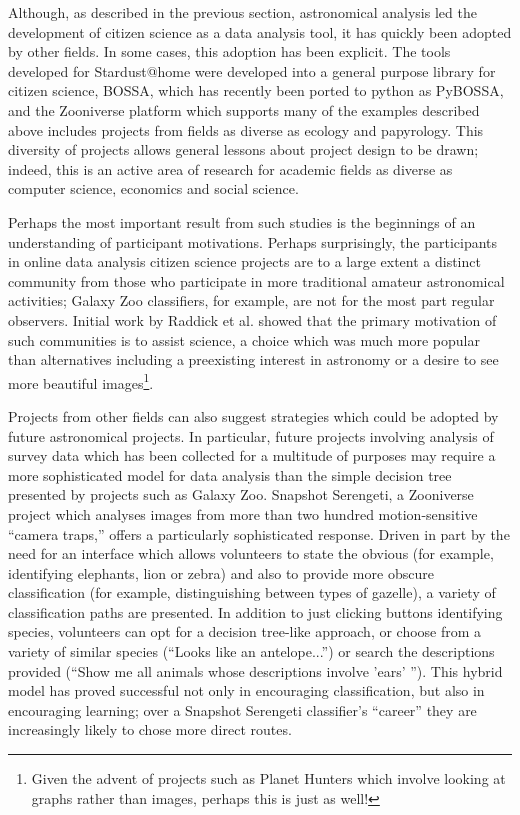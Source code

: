 \documentclass{ar2e}
\begin{document}
Although, as described in the previous section, astronomical analysis led the
development of citizen science as a data analysis tool, it has quickly been
adopted by other fields. In some cases, this adoption has been explicit. The
tools developed for Stardust@home were developed into a general purpose
library for citizen science, BOSSA, which has recently been ported to python
as PyBOSSA, and the Zooniverse platform which supports many of the examples
described above includes projects from fields as diverse as ecology and
papyrology. This diversity of projects allows general lessons about project
design to be drawn; indeed, this is an active area of research for academic
fields as diverse as computer science, economics and social science. 


Perhaps the most important result from such studies is the beginnings of an
understanding of participant motivations. Perhaps surprisingly, the
participants in online data analysis citizen science projects are to a large
extent a distinct community from those who participate in more traditional
amateur astronomical activities; Galaxy Zoo classifiers, for example, are not
for the most part regular observers. Initial work by Raddick et al. showed
that the primary motivation of such communities is to assist science, a choice
which was much more popular than alternatives including a preexisting interest
in astronomy or a desire to see more beautiful images\footnote{Given the
advent of projects such as Planet Hunters which involve looking at graphs
rather than images, perhaps this is just as well!}. 


Projects from other fields can also suggest strategies which could be adopted
by future astronomical projects. In particular, future projects involving
analysis of survey data which has been collected for a multitude of purposes
may require a more sophisticated model for data analysis than the simple
decision tree presented by projects such as Galaxy Zoo. Snapshot Serengeti, a
Zooniverse project which analyses images from more than two hundred
motion-sensitive ``camera traps,'' offers a particularly sophisticated response.
Driven in part by the need for an interface which allows volunteers to state
the obvious (for example, identifying elephants, lion or zebra) and also to
provide more obscure classification (for example, distinguishing between types
of gazelle), a variety of classification paths are presented. In addition to
just clicking buttons identifying species, volunteers can opt for a decision
tree-like approach, or choose from a variety of similar species (``Looks like
an antelope...'') or search the descriptions provided (``Show me all animals
whose descriptions involve 'ears' ''). This hybrid model has proved successful
not only in encouraging classification, but also in encouraging learning; over
a Snapshot Serengeti classifier's ``career'' they are increasingly likely to
chose more direct routes.
\end{document}
